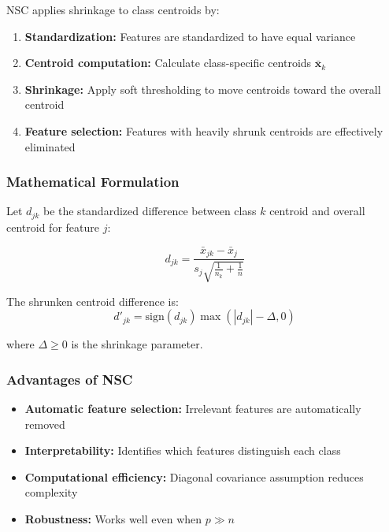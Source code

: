 \documentclass[12pt,a4paper]{article}
\begin{document}
NSC applies shrinkage to class centroids by:

\begin{enumerate}
    \item \textbf{Standardization:} Features are standardized to have equal variance
    \item \textbf{Centroid computation:} Calculate class-specific centroids $\bar{\mathbf{x}}_k$
    \item \textbf{Shrinkage:} Apply soft thresholding to move centroids toward the overall centroid
    \item \textbf{Feature selection:} Features with heavily shrunk centroids are effectively eliminated
\end{enumerate}

\subsubsection{Mathematical Formulation}

Let $d_{jk}$ be the standardized difference between class $k$ centroid and overall centroid for feature $j$:

\begin{equation}
d_{jk} = \frac{\bar{x}_{jk} - \bar{x}_j}{s_j \sqrt{\frac{1}{n_k} + \frac{1}{n}}}
\end{equation}

The shrunken centroid difference is:
\begin{equation}
d'_{jk} = \text{sign}(d_{jk}) \max(|d_{jk}| - \Delta, 0)
\end{equation}

where $\Delta \geq 0$ is the shrinkage parameter.

\subsubsection{Advantages of NSC}

\begin{itemize}
    \item \textbf{Automatic feature selection:} Irrelevant features are automatically removed
    \item \textbf{Interpretability:} Identifies which features distinguish each class
    \item \textbf{Computational efficiency:} Diagonal covariance assumption reduces complexity
    \item \textbf{Robustness:} Works well even when $p \gg n$
\end{itemize}
\end{document}
